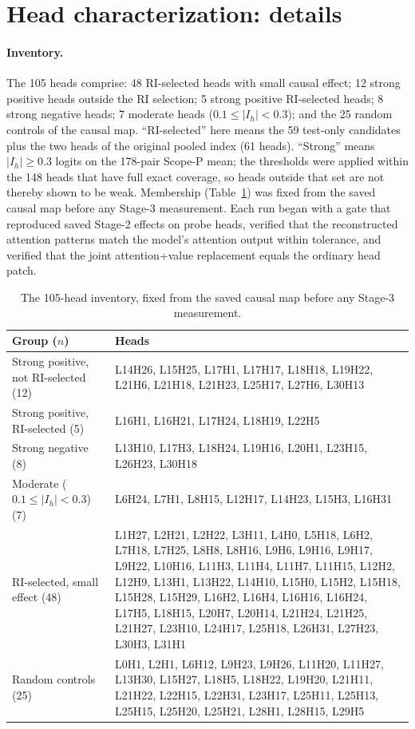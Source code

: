 \section{Head characterization: details}
\label{app:stage3}

\paragraph{Inventory.}
The 105 heads comprise: 48 RI-selected heads with small causal effect; 12 strong
positive heads outside the RI selection; 5 strong positive RI-selected heads; 8
strong negative heads; 7 moderate heads ($0.1\le|I_h|<0.3$); and the 25 random
controls of the causal map. ``RI-selected'' here means the 59 test-only candidates
plus the two heads of the original pooled index (61 heads). ``Strong'' means
$|I_h|\ge0.3$ logits on the 178-pair Scope-P mean; the thresholds were applied
within the 148 heads that have full exact coverage, so heads outside that set are
not thereby shown to be weak. Membership (Table~\ref{tab:inventory}) was fixed from the saved causal map before
any Stage-3 measurement. Each run began with a gate that reproduced saved Stage-2
effects on probe heads, verified that the reconstructed attention patterns match the
model's attention output within tolerance, and verified that the joint
attention+value replacement equals the ordinary head patch.

\begin{table}[h]
\centering\scriptsize
\setlength{\tabcolsep}{3pt}
\begin{tabular}{@{}p{2.3cm}p{5.0cm}@{}}
\toprule
Group ($n$) & Heads \\
\midrule
Strong positive, not RI-selected (12) & L14H26, L15H25, L17H1, L17H17, L18H18, L19H22, L21H6, L21H18, L21H23, L25H17, L27H6, L30H13 \\
Strong positive, RI-selected (5) & L16H1, L16H21, L17H24, L18H19, L22H5 \\
Strong negative (8) & L13H10, L17H3, L18H24, L19H16, L20H1, L23H15, L26H23, L30H18 \\
Moderate ($0.1\le|I_h|<0.3$) (7) & L6H24, L7H1, L8H15, L12H17, L14H23, L15H3, L16H31 \\
RI-selected, small effect (48) & L1H27, L2H21, L2H22, L3H11, L4H0, L5H18, L6H2, L7H18, L7H25, L8H8, L8H16, L9H6, L9H16, L9H17, L9H22, L10H16, L11H3, L11H4, L11H7, L11H15, L12H2, L12H9, L13H1, L13H22, L14H10, L15H0, L15H2, L15H18, L15H28, L15H29, L16H2, L16H4, L16H16, L16H24, L17H5, L18H15, L20H7, L20H14, L21H24, L21H25, L21H27, L23H10, L24H17, L25H18, L26H31, L27H23, L30H3, L31H1 \\
Random controls (25) & L0H1, L2H1, L6H12, L9H23, L9H26, L11H20, L11H27, L13H30, L15H27, L18H5, L18H22, L19H20, L21H11, L21H22, L22H15, L22H31, L23H17, L25H11, L25H13, L25H15, L25H20, L25H21, L28H1, L28H15, L29H5 \\
\bottomrule
\end{tabular}
\caption{The 105-head inventory, fixed from the saved causal map before any Stage-3
measurement.}
\label{tab:inventory}
\end{table}

